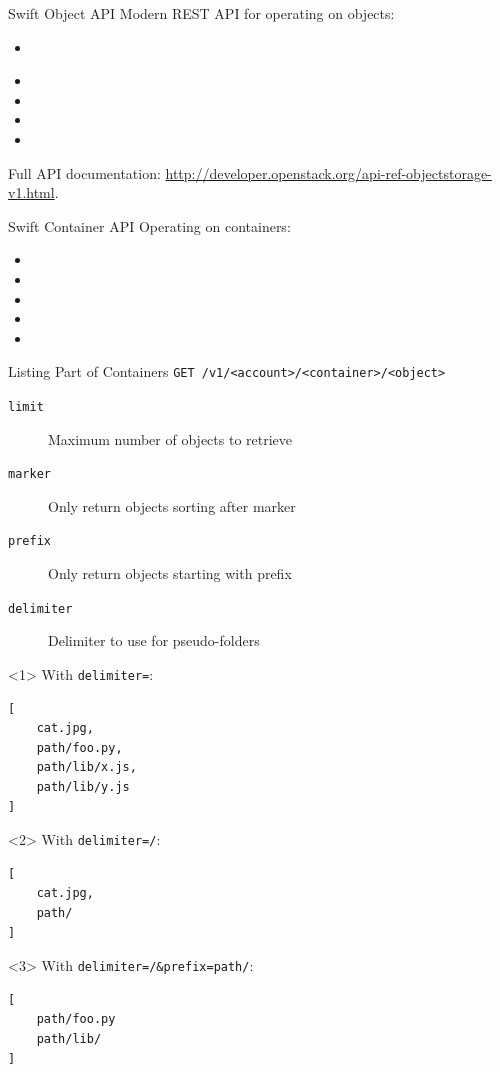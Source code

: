 \documentclass[t,noamsthm]{beamer}
\begin{document}
\begin{frame}{Swift Object API}
  Modern REST API for operating on objects:
  \begin{itemize}
  \item \alert<2>{}
  \item {}
  \item {}
  \item {}
  \item {}
  \end{itemize}

  Full API documentation: \url{http://developer.openstack.org/api-ref-objectstorage-v1.html}.
\end{frame}

\begin{frame}{Swift Container API}
  Operating on containers:
  \begin{itemize}
  \item {}
  \item {}
  \item {}
  \item {}
  \item {}
  \end{itemize}
\end{frame}

\begin{frame}[fragile]{Listing Part of Containers}
  \texttt{GET /v1/<account>/<container>/<object>}
  \begin{description}
  \item[\texttt{limit}] Maximum number of objects to retrieve
  \item[\texttt{marker}] Only return objects sorting after marker
  \item[\texttt{prefix}] Only return objects starting with prefix
  \item[\texttt{delimiter}] Delimiter to use for pseudo-folders
  \end{description}

\begin{onlyenv}<1>
  With \texttt{delimiter=}:
\begin{lstlisting}[]
[
    cat.jpg,
    path/foo.py,
    path/lib/x.js,
    path/lib/y.js
]
\end{lstlisting}
\end{onlyenv}
\begin{onlyenv}<2>
  With \texttt{delimiter=/}:
\begin{lstlisting}[]
[
    cat.jpg,
    path/
]
\end{lstlisting}
\end{onlyenv}
\begin{onlyenv}<3>
  With \texttt{delimiter=/\&prefix=path/}:
\begin{lstlisting}[]
[
    path/foo.py
    path/lib/
]
\end{lstlisting}
\end{onlyenv}
\end{frame}
\end{document}
